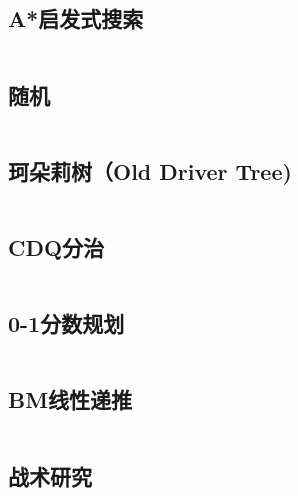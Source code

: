 \inputminted{cpp}{code/DLX.cc}

\subsection{A*启发式搜索} 

\inputminted{cpp}{code/A*启发式搜索.cc}

\subsection{随机} 

\inputminted{cpp}{code/random.cc}

\subsection{珂朵莉树（Old Driver Tree)} 

\inputminted{cpp}{code/ODT.cc}

\subsection{CDQ分治} 

\inputminted{cpp}{code/CDQ.cc}

\subsection{0-1分数规划} 

\inputminted{cpp}{code/0-1planning.cpp}

\subsection{BM线性递推} 

\inputminted{cpp}{code/BM.cc}

\subsection{战术研究} 

\inputminted{text}{code/战术研究.txt}

